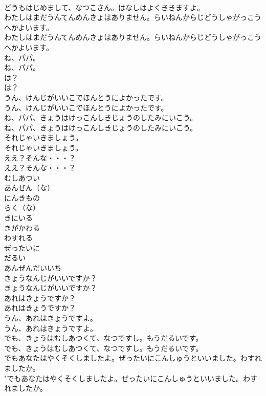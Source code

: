 \documentclass[8pt]{extreport}
\begin{document}
\begin{CJK}{UTF8}{min}
\\	どうもはじめまして、なつこさん。はなしはよくききますよ。 
\\	わたしはまだうんてんめんきょはありません。らいねんからじどうしゃがっこうへかよいます。	
\\	わたしはまだうんてんめんきょはありません。らいねんからじどうしゃがっこうへかよいます。 
\\	ね、パパ。	
\\	ね、パパ。 
\\	は？	
\\	は？ 
\\	うん、けんじがいいこでほんとうによかったです。	
\\	うん、けんじがいいこでほんとうによかったです。 
\\	ね、パパ、きょうはけっこんしきじょうのしたみにいこう。	
\\	ね、パパ、きょうはけっこんしきじょうのしたみにいこう。 
\\	それじゃいきましょう。	
\\	それじゃいきましょう。 
\\	ええ？そんな・・・？	
\\	ええ？そんな・・・？ 
\\	むしあつい
\\	あんぜん（な）
\\	にんきもの
\\	らく（な）
\\	きにいる
\\	きがかわる
\\	わすれる
\\	ぜったいに
\\	だるい
\\	あんぜんだいいち
\\	きょうなんじがいいですか？	
\\	きょうなんじがいいですか？ 
\\	あれはきょうですか？	
\\	あれはきょうですか？ 
\\	うん、あれはきょうですよ。	
\\	うん、あれはきょうですよ。 
\\	でも、きょうはむしあつくて、なつですし。もうだるいです。	
\\	でも、きょうはむしあつくて、なつですし。もうだるいです。 
\\	でもあなたはやくそくしましたよ。ぜったいにこんしゅうといいました。わすれましたか。	
\\	"でもあなたはやくそくしましたよ。ぜったいにこんしゅうといいました。わすれましたか。 

\end{CJK}
\end{document}
